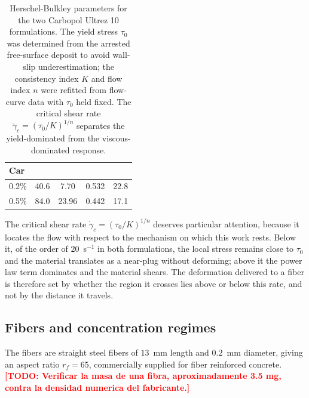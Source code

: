 \documentclass[%
  aip,
  pof,          %
  reprint,      %
  floatfix
]{revtex4-2}
\newcommand{\todo}[1]{\textcolor{red}{\textbf{[TODO: #1]}}}
\begin{document}
\begin{table}[htb]
\centering
\caption{Herschel-Bulkley parameters for the two Carbopol Ultrez 10 formulations. The yield stress $\tau_0$ was determined from the arrested free-surface deposit to avoid wall-slip underestimation; the consistency index $K$ and flow index $n$ were refitted from flow-curve data with $\tau_0$ held fixed. The critical shear rate $\dot{\gamma}_c = (\tau_0/K)^{1/n}$ separates the yield-dominated from the viscous-dominated response.}
\label{tab:carbopol_rheology}
\begin{tabular}{
    l
    S[table-format=2.1]
    S[table-format=2.2]
    S[table-format=1.3]
    S[table-format=2.1]
}
\toprule
\textbf{Car} &
   &
   &
   &
   \\
\% & 40.6 & 7.70  & 0.532 & 22.8 \\
0.5\% & 84.0 & 23.96 & 0.442 & 17.1 \\
\bottomrule
\end{tabular}
\end{table}

The critical shear rate $\dot{\gamma}_c = (\tau_0/K)^{1/n}$ deserves particular attention, because it locates the flow with respect to the mechanism on which this work rests. Below it, of the order of $20$~s$^{-1}$ in both formulations, the local stress remains close to $\tau_0$ and the material translates as a near-plug without deforming; above it the power law term dominates and the material shears. The deformation delivered to a fiber is therefore set by whether the region it crosses lies above or below this rate, and not by the distance it travels.

\subsection{Fibers and concentration regimes}
\label{sec:fibers}

The fibers are straight steel fibers of $13$~mm length and $0.2$~mm diameter, giving an aspect ratio $r_f = 65$, commercially supplied for fiber reinforced concrete. \todo{Verificar la masa de una fibra, aproximadamente 3.5 mg, contra la densidad numerica del fabricante.}
\end{document}
